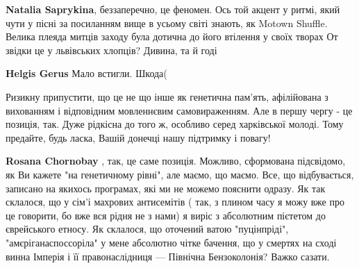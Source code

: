 \begin{itemize}
 
\textbf{Natalia Saprykina}, беззаперечно, це феномен.
Ось той акцент у ритмі, який чути у пісні за посиланням вище в усьому світі знають, як Motown Shuffle.
Велика плеяда митців заходу була дотична до його втілення у своїх творах
От звідки це у львівських хлопців?
Дивина, та й годі

\begin{itemize} %
 
\textbf{Helgis Gerus} Мало встигли. Шкода(
\end{itemize} %

 

Ризикну припустити, що це не що інше як генетична пам'ять, афілійована з
вихованням і відповідним мовленнєвим самовираженням. Але в першу чергу - це
позиція, так. Дуже рідкісна до того ж, особливо серед харківської молоді. Тому
предайте, будь ласка, Вашій донечці нашу підтримку і повагу!

\begin{itemize} %
 
\textbf{Rosana Chornobay} , так, це саме позиція.
Можливо, сформована підсвідомо, як Ви кажете "на генетичному рівні", але маємо, що маємо.
Все, що відбувається, записано на якихось програмах, які ми не можемо пояснити одразу.
Як так склалося, що у сім'і махрових антисемітів ( так, з плином часу я можу вже про це говорити, бо вже вся рідня не з нами) я виріс з абсолютним пієтетом до єврейського етносу.
Як склалося, що оточений ватою "пуцінпріді", "амєріганаспоссоріла" у мене абсолютно чітке бачення, що у смертях на сході винна Імперія і її правонаслідниця — Північна Бензоколонія?
Важко сазати.
\end{itemize} %


\end{itemize}
